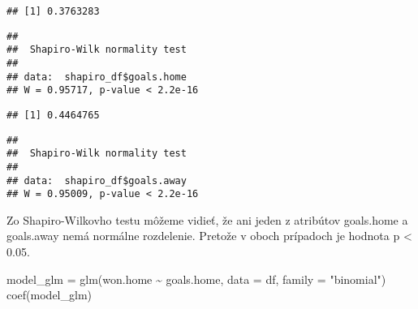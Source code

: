 \documentclass[
]{article}
\newenvironment{Shaded}{\begin{snugshade}}{\end{snugshade}}
\newcommand{\AttributeTok}[1]{\textcolor[rgb]{0.77,0.63,0.00}{#1}}
\newcommand{\FunctionTok}[1]{\textcolor[rgb]{0.00,0.00,0.00}{#1}}
\newcommand{\NormalTok}[1]{#1}
\newcommand{\OtherTok}[1]{\textcolor[rgb]{0.56,0.35,0.01}{#1}}
\newcommand{\SpecialCharTok}[1]{\textcolor[rgb]{0.00,0.00,0.00}{#1}}
\newcommand{\StringTok}[1]{\textcolor[rgb]{0.31,0.60,0.02}{#1}}
\begin{document}
\begin{verbatim}
## [1] 0.3763283
\end{verbatim}

\begin{Shaded}
\end{Shaded}

\begin{verbatim}
## 
##  Shapiro-Wilk normality test
## 
## data:  shapiro_df$goals.home
## W = 0.95717, p-value < 2.2e-16
\end{verbatim}

\begin{Shaded}
\end{Shaded}

\begin{verbatim}
## [1] 0.4464765
\end{verbatim}

\begin{Shaded}
\end{Shaded}

\begin{verbatim}
## 
##  Shapiro-Wilk normality test
## 
## data:  shapiro_df$goals.away
## W = 0.95009, p-value < 2.2e-16
\end{verbatim}

Zo Shapiro-Wilkovho testu môžeme vidieť, že ani jeden z atribútov
goals.home a goals.away nemá normálne rozdelenie. Pretože v oboch
prípadoch je hodnota p \textless{} 0.05.

\begin{Shaded}
\begin{Highlighting}[]
\NormalTok{model\_glm }\OtherTok{=} \FunctionTok{glm}\NormalTok{(won.home }\SpecialCharTok{\textasciitilde{}}\NormalTok{ goals.home, }\AttributeTok{data =}\NormalTok{ df, }\AttributeTok{family =} \StringTok{"binomial"}\NormalTok{)}
\FunctionTok{coef}\NormalTok{(model\_glm)}
\end{Highlighting}
\end{Shaded}
\end{document}
